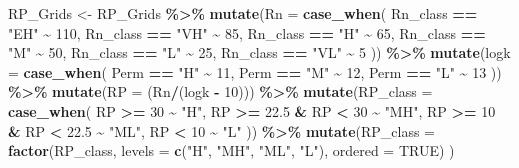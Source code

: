 \documentclass[
  12pt,
]{article}
\newenvironment{Shaded}{\begin{snugshade}}{\end{snugshade}}
\newcommand{\DataTypeTok}[1]{\textcolor[rgb]{0.13,0.29,0.53}{#1}}
\newcommand{\DecValTok}[1]{\textcolor[rgb]{0.00,0.00,0.81}{#1}}
\newcommand{\FloatTok}[1]{\textcolor[rgb]{0.00,0.00,0.81}{#1}}
\newcommand{\KeywordTok}[1]{\textcolor[rgb]{0.13,0.29,0.53}{\textbf{#1}}}
\newcommand{\NormalTok}[1]{#1}
\newcommand{\OperatorTok}[1]{\textcolor[rgb]{0.81,0.36,0.00}{\textbf{#1}}}
\newcommand{\OtherTok}[1]{\textcolor[rgb]{0.56,0.35,0.01}{#1}}
\newcommand{\StringTok}[1]{\textcolor[rgb]{0.31,0.60,0.02}{#1}}
\begin{document}
\begin{Shaded}
\begin{Highlighting}[]
\NormalTok{  RP\_Grids  \textless{}{-}}\StringTok{  }\NormalTok{RP\_Grids }\OperatorTok{\%\textgreater{}\%}
\StringTok{    }\KeywordTok{mutate}\NormalTok{(}\DataTypeTok{Rn =} \KeywordTok{case\_when}\NormalTok{(}
\NormalTok{      Rn\_class }\OperatorTok{==}\StringTok{ "EH"} \OperatorTok{\textasciitilde{}}\StringTok{ }\DecValTok{110}\NormalTok{,}
\NormalTok{      Rn\_class }\OperatorTok{==}\StringTok{ "VH"} \OperatorTok{\textasciitilde{}}\StringTok{  }\DecValTok{85}\NormalTok{,}
\NormalTok{      Rn\_class }\OperatorTok{==}\StringTok{ "H"}  \OperatorTok{\textasciitilde{}}\StringTok{  }\DecValTok{65}\NormalTok{,}
\NormalTok{      Rn\_class }\OperatorTok{==}\StringTok{ "M"}  \OperatorTok{\textasciitilde{}}\StringTok{  }\DecValTok{50}\NormalTok{,}
\NormalTok{      Rn\_class }\OperatorTok{==}\StringTok{ "L"}  \OperatorTok{\textasciitilde{}}\StringTok{  }\DecValTok{25}\NormalTok{,}
\NormalTok{      Rn\_class }\OperatorTok{==}\StringTok{ "VL"} \OperatorTok{\textasciitilde{}}\StringTok{   }\DecValTok{5}
\NormalTok{    )) }\OperatorTok{\%\textgreater{}\%}
\StringTok{    }\KeywordTok{mutate}\NormalTok{(}\DataTypeTok{logk =} \KeywordTok{case\_when}\NormalTok{(}
\NormalTok{      Perm }\OperatorTok{==}\StringTok{ "H"} \OperatorTok{\textasciitilde{}}\StringTok{ }\DecValTok{11}\NormalTok{,}
\NormalTok{      Perm }\OperatorTok{==}\StringTok{ "M"} \OperatorTok{\textasciitilde{}}\StringTok{ }\DecValTok{12}\NormalTok{,}
\NormalTok{      Perm }\OperatorTok{==}\StringTok{ "L"} \OperatorTok{\textasciitilde{}}\StringTok{ }\DecValTok{13}
\NormalTok{    )) }\OperatorTok{\%\textgreater{}\%}
\StringTok{    }\KeywordTok{mutate}\NormalTok{(}\DataTypeTok{RP =}\NormalTok{ (Rn}\OperatorTok{/}\NormalTok{(logk }\OperatorTok{{-}}\StringTok{ }\DecValTok{10}\NormalTok{))) }\OperatorTok{\%\textgreater{}\%}
\StringTok{    }\KeywordTok{mutate}\NormalTok{(}\DataTypeTok{RP\_class =} \KeywordTok{case\_when}\NormalTok{(}
\NormalTok{      RP }\OperatorTok{\textgreater{}=}\StringTok{ }\DecValTok{30}                 \OperatorTok{\textasciitilde{}}\StringTok{  "H"}\NormalTok{,}
\NormalTok{      RP }\OperatorTok{\textgreater{}=}\StringTok{ }\FloatTok{22.5} \OperatorTok{\&}\StringTok{  }\NormalTok{RP }\OperatorTok{\textless{}}\StringTok{  }\DecValTok{30}   \OperatorTok{\textasciitilde{}}\StringTok{ "MH"}\NormalTok{,}
\NormalTok{      RP }\OperatorTok{\textgreater{}=}\StringTok{ }\DecValTok{10}   \OperatorTok{\&}\StringTok{  }\NormalTok{RP }\OperatorTok{\textless{}}\StringTok{  }\FloatTok{22.5} \OperatorTok{\textasciitilde{}}\StringTok{ "ML"}\NormalTok{,                 }
\NormalTok{      RP }\OperatorTok{\textless{}}\StringTok{  }\DecValTok{10}                 \OperatorTok{\textasciitilde{}}\StringTok{  "L"}
\NormalTok{      )) }\OperatorTok{\%\textgreater{}\%}
\StringTok{    }\KeywordTok{mutate}\NormalTok{(}\DataTypeTok{RP\_class =} \KeywordTok{factor}\NormalTok{(RP\_class, }
                             \DataTypeTok{levels =} \KeywordTok{c}\NormalTok{(}\StringTok{"H"}\NormalTok{, }\StringTok{"MH"}\NormalTok{, }\StringTok{"ML"}\NormalTok{, }\StringTok{"L"}\NormalTok{),}
                             \DataTypeTok{ordered =} \OtherTok{TRUE}\NormalTok{)}
\NormalTok{    )}


\end{Highlighting}
\end{Shaded}
\end{document}
